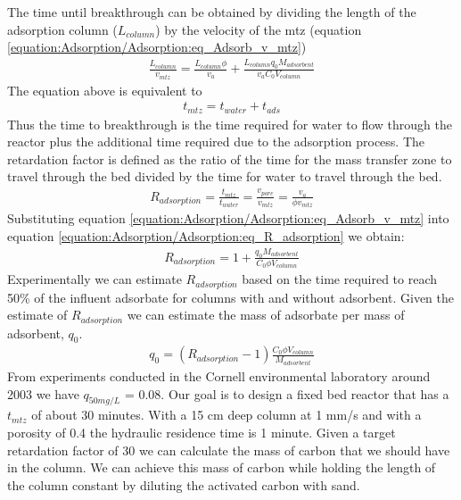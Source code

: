\documentclass[letterpaper,10pt,english]{sphinxmanual}
\begin{document}
The time until breakthrough can be obtained by dividing the length of the adsorption column (\(L_{column}\)) by the velocity of the mtz (equation \eqref{equation:Adsorption/Adsorption:eq_Adsorb_v_mtz})
\begin{equation}\label{equation:Adsorption/Adsorption:Adsorption/Adsorption:4}
\begin{split}\frac{L_{column}}{v_{mtz}} = \frac{L_{column}\phi}{v_a} + \frac{L_{column}q_0 M_{adsorbent}}{v_a C_0 V_{column}}\end{split}
\end{equation}
The equation above is equivalent to
\begin{equation}\label{equation:Adsorption/Adsorption:Adsorption/Adsorption:5}
\begin{split}t_{mtz} = t_{water} + t_{ads}\end{split}
\end{equation}
Thus the time to breakthrough is the time required for water to flow through the reactor plus the additional time required due to the adsorption process. The retardation factor is defined as the ratio of the time for the mass transfer zone to travel through the bed divided by the time for water to travel through the bed.
\begin{equation}\label{equation:Adsorption/Adsorption:eq_R_adsorption_tmz}
\begin{split}R_{adsorption} = \frac{t_{mtz}}{t_{water}} = \frac{v_{pore}}{v_{mtz}} = \frac{v_a}{\phi v_{mtz}}\end{split}
\end{equation}
Substituting equation \eqref{equation:Adsorption/Adsorption:eq_Adsorb_v_mtz} into equation \eqref{equation:Adsorption/Adsorption:eq_R_adsorption} we obtain:
\begin{equation}\label{equation:Adsorption/Adsorption:eq_R_adsorption}
\begin{split} R_{adsorption} =1+ \frac{q_0 M_{adsorbent}}{C_0 \phi V_{column}}\end{split}
\end{equation}
Experimentally we can estimate \(R_{adsorption}\) based on the time required to reach 50\% of the influent adsorbate for columns with and without adsorbent. Given the estimate of \(R_{adsorption}\) we can estimate the mass of adsorbate per mass of adsorbent,  \(q_0\).
\begin{equation}\label{equation:Adsorption/Adsorption:eq_q_0}
\begin{split} q_0 = \left(R_{adsorption} - 1\right) \frac{C_0 \phi V_{column}}{M_{adsorbent}}\end{split}
\end{equation}
From experiments conducted in the Cornell environmental laboratory around 2003 we have  \(q_{50 mg/L}\) = 0.08. Our goal is to design a fixed bed reactor that has a \(t_{mtz}\) of about 30 minutes. With a 15 cm deep column at 1 mm/s and with a porosity of 0.4 the hydraulic residence time is 1 minute. Given a target retardation factor of 30 we can calculate the mass of carbon that we should have in the column. We can achieve this mass of carbon while holding the length of the column constant by diluting the activated carbon with sand.
\end{document}
